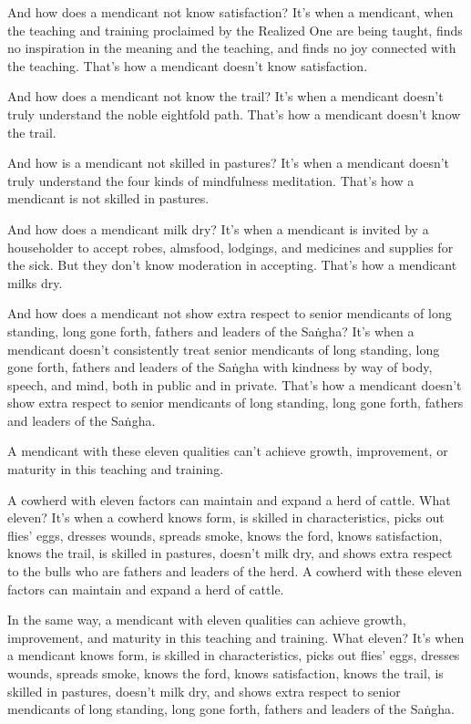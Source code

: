\documentclass[12pt,openany]{book}%
\begin{document}
And how does a mendicant not know satisfaction? It’s when a mendicant, when the teaching and training proclaimed by the Realized One are being taught, finds no inspiration in the meaning and the teaching, and finds no joy connected with the teaching. That’s how a mendicant doesn’t know satisfaction. 

And how does a mendicant not know the trail? It’s when a mendicant doesn’t truly understand the noble eightfold path. That’s how a mendicant doesn’t know the trail. 

And how is a mendicant not skilled in pastures? It’s when a mendicant doesn’t truly understand the four kinds of mindfulness meditation. That’s how a mendicant is not skilled in pastures. 

And how does a mendicant milk dry? It’s when a mendicant is invited by a householder to accept robes, almsfood, lodgings, and medicines and supplies for the sick. But they don’t know moderation in accepting. That’s how a mendicant milks dry. 

And how does a mendicant not show extra respect to senior mendicants of long standing, long gone forth, fathers and leaders of the \textsanskrit{Saṅgha}? It’s when a mendicant doesn’t consistently treat senior mendicants of long standing, long gone forth, fathers and leaders of the \textsanskrit{Saṅgha} with kindness by way of body, speech, and mind, both in public and in private. That’s how a mendicant doesn’t show extra respect to senior mendicants of long standing, long gone forth, fathers and leaders of the \textsanskrit{Saṅgha}. 

A mendicant with these eleven qualities can’t achieve growth, improvement, or maturity in this teaching and training. 

A cowherd with eleven factors can maintain and expand a herd of cattle. What eleven? It’s when a cowherd knows form, is skilled in characteristics, picks out flies’ eggs, dresses wounds, spreads smoke, knows the ford, knows satisfaction, knows the trail, is skilled in pastures, doesn’t milk dry, and shows extra respect to the bulls who are fathers and leaders of the herd. A cowherd with these eleven factors can maintain and expand a herd of cattle. 

In the same way, a mendicant with eleven qualities can achieve growth, improvement, and maturity in this teaching and training. What eleven? It’s when a mendicant knows form, is skilled in characteristics, picks out flies’ eggs, dresses wounds, spreads smoke, knows the ford, knows satisfaction, knows the trail, is skilled in pastures, doesn’t milk dry, and shows extra respect to senior mendicants of long standing, long gone forth, fathers and leaders of the \textsanskrit{Saṅgha}. 
\end{document}
